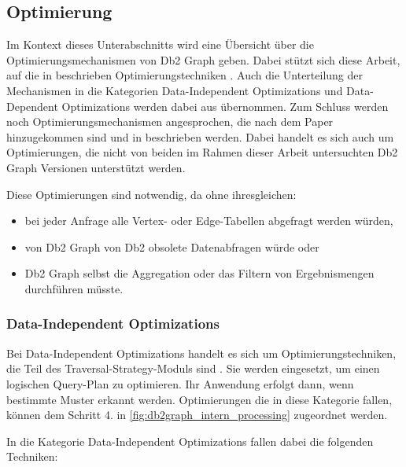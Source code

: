 \subsection{Optimierung}
\label{db2graph:optimierung}

Im Kontext dieses Unterabschnitts wird eine Übersicht über die Optimierungsmechanismen von Db2 Graph geben. Dabei stützt sich diese Arbeit, auf die in \cite{sigmod_tian} beschrieben Optimierungstechniken \cite{sigmod_tian}. Auch die Unterteilung der Mechanismen in die Kategorien Data-Independent Optimizations und Data-Dependent Optimizations werden dabei aus \cite{sigmod_tian} übernommen. Zum Schluss werden noch Optimierungsmechanismen angesprochen, die nach dem Paper \cite{sigmod_tian} hinzugekommen sind und in \cite{ibm_docs_optimize} beschrieben werden. Dabei handelt es sich auch um Optimierungen, die nicht von beiden im Rahmen dieser Arbeit untersuchten Db2 Graph Versionen unterstützt werden. 

Diese Optimierungen sind notwendig, da ohne ihresgleichen:

\begin{itemize}
    \item bei jeder Anfrage alle Vertex- oder Edge-Tabellen abgefragt werden würden, 
    \item von Db2 Graph von Db2 obsolete Datenabfragen würde oder 
    \item Db2 Graph selbst die Aggregation oder das Filtern von Ergebnismengen durchführen müsste.
\end{itemize}

\subsubsection{Data-Independent Optimizations}
\label{subsubsec:data_independent_optimizations}
Bei Data-Independent Optimizations handelt es sich um Optimierungstechniken, die Teil des Traversal-Strategy-Moduls sind \cite{sigmod_tian}. Sie werden eingesetzt, um einen logischen Query-Plan zu optimieren. Ihr Anwendung erfolgt dann, wenn bestimmte Muster erkannt werden. Optimierungen die in diese Kategorie fallen, können dem Schritt 4. in \autoref{fig:db2graph_intern_processing} zugeordnet werden. 

In die Kategorie Data-Independent Optimizations fallen dabei die folgenden Techniken: 

